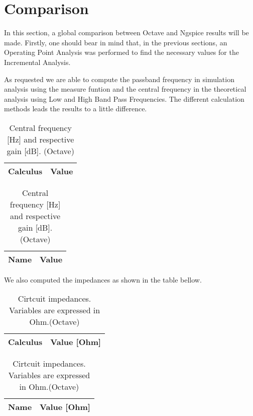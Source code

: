 \section{Comparison}
\label{section:comparison}

\par In this section, a global comparison between Octave and Ngspice results will be made. Firstly, one should bear in mind that, in the previous sections, an Operating Point Analysis was performed to find the necessary values for the Incremental Analysis. 

\par As requested we are able to compute the passband frequency in simulation analysis using the measure funtion and the central frequency in the theoretical analysis using Low and High Band Pass Frequencies. The different calculation methods leads the results to a little difference.


 \begin{table}[h]
\parbox{.45\linewidth}{
  \centering
  \begin{tabular}{|l|r|}
    \hline    
    {\bf Calculus} & {\bf Value} \\ \hline
    
  \end{tabular}
  \caption{Central frequency [Hz] and respective gain [dB]. (Ngspice)}} 
\parbox{.45\linewidth}{
 \centering
  \begin{tabular}{|l|r|}
    \hline    
    {\bf Name} & {\bf Value} \\ \hline
    
  \end{tabular}
  \caption{Central frequency [Hz] and respective gain [dB]. (Octave)}}
\end{table}

We also computed the impedances as shown in the table bellow.


\begin{table}[ht]
\parbox{.45\linewidth}{
  \centering
  \begin{tabular}{|l|r|}
    \hline    
    {\bf Calculus} & {\bf Value [Ohm]} \\ \hline
    
  \end{tabular}
  \caption{Cirtcuit impedances. Variables are expressed in Ohm.(Ngspice)}} 
\parbox{.45\linewidth}{
 \centering
  \begin{tabular}{|l|r|}
    \hline    
    {\bf Name} & {\bf Value [Ohm]} \\ \hline
    
  \end{tabular}
  \caption{Cirtcuit impedances. Variables are expressed in Ohm.(Octave)}}
\end{table}








